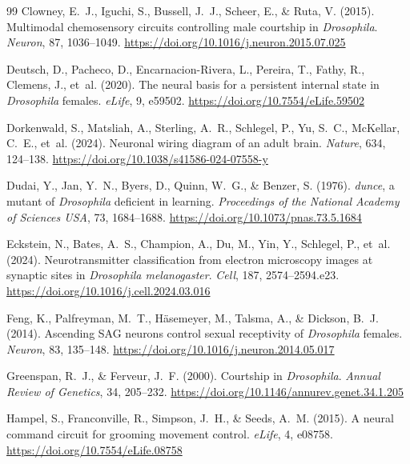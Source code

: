 \documentclass[11pt,a4paper]{article}
\begin{document}
\begin{thebibliography}{99}
Clowney, E.~J., Iguchi, S., Bussell, J.~J., Scheer, E., \& Ruta, V. (2015). Multimodal chemosensory circuits controlling male courtship in \emph{Drosophila}. \emph{Neuron}, 87, 1036--1049. \url{https://doi.org/10.1016/j.neuron.2015.07.025}

Deutsch, D., Pacheco, D., Encarnacion-Rivera, L., Pereira, T., Fathy, R., Clemens, J., et~al. (2020). The neural basis for a persistent internal state in \emph{Drosophila} females. \emph{eLife}, 9, e59502. \url{https://doi.org/10.7554/eLife.59502}

Dorkenwald, S., Matsliah, A., Sterling, A.~R., Schlegel, P., Yu, S.~C., McKellar, C.~E., et~al. (2024). Neuronal wiring diagram of an adult brain. \emph{Nature}, 634, 124--138. \url{https://doi.org/10.1038/s41586-024-07558-y}

Dudai, Y., Jan, Y.~N., Byers, D., Quinn, W.~G., \& Benzer, S. (1976). \emph{dunce}, a mutant of \emph{Drosophila} deficient in learning. \emph{Proceedings of the National Academy of Sciences USA}, 73, 1684--1688. \url{https://doi.org/10.1073/pnas.73.5.1684}

Eckstein, N., Bates, A.~S., Champion, A., Du, M., Yin, Y., Schlegel, P., et~al. (2024). Neurotransmitter classification from electron microscopy images at synaptic sites in \emph{Drosophila melanogaster}. \emph{Cell}, 187, 2574--2594.e23. \url{https://doi.org/10.1016/j.cell.2024.03.016}

Feng, K., Palfreyman, M.~T., H\"{a}semeyer, M., Talsma, A., \& Dickson, B.~J. (2014). Ascending SAG neurons control sexual receptivity of \emph{Drosophila} females. \emph{Neuron}, 83, 135--148. \url{https://doi.org/10.1016/j.neuron.2014.05.017}

Greenspan, R.~J., \& Ferveur, J.~F. (2000). Courtship in \emph{Drosophila}. \emph{Annual Review of Genetics}, 34, 205--232. \url{https://doi.org/10.1146/annurev.genet.34.1.205}

Hampel, S., Franconville, R., Simpson, J.~H., \& Seeds, A.~M. (2015). A neural command circuit for grooming movement control. \emph{eLife}, 4, e08758. \url{https://doi.org/10.7554/eLife.08758}


\end{thebibliography}
\end{document}
